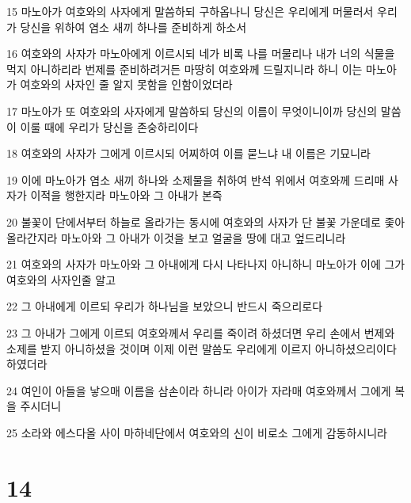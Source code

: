 \par 15 마노아가 여호와의 사자에게 말씀하되 구하옵나니 당신은 우리에게 머물러서 우리가 당신을 위하여 염소 새끼 하나를 준비하게 하소서
\par 16 여호와의 사자가 마노아에게 이르시되 네가 비록 나를 머물리나 내가 너의 식물을 먹지 아니하리라 번제를 준비하려거든 마땅히 여호와께 드릴지니라 하니 이는 마노아가 여호와의 사자인 줄 알지 못함을 인함이었더라
\par 17 마노아가 또 여호와의 사자에게 말씀하되 당신의 이름이 무엇이니이까 당신의 말씀이 이룰 때에 우리가 당신을 존숭하리이다
\par 18 여호와의 사자가 그에게 이르시되 어찌하여 이를 묻느냐 내 이름은 기묘니라
\par 19 이에 마노아가 염소 새끼 하나와 소제물을 취하여 반석 위에서 여호와께 드리매 사자가 이적을 행한지라 마노아와 그 아내가 본즉
\par 20 불꽃이 단에서부터 하늘로 올라가는 동시에 여호와의 사자가 단 불꽃 가운데로 좇아 올라간지라 마노아와 그 아내가 이것을 보고 얼굴을 땅에 대고 엎드리니라
\par 21 여호와의 사자가 마노아와 그 아내에게 다시 나타나지 아니하니 마노아가 이에 그가 여호와의 사자인줄 알고
\par 22 그 아내에게 이르되 우리가 하나님을 보았으니 반드시 죽으리로다
\par 23 그 아내가 그에게 이르되 여호와께서 우리를 죽이려 하셨더면 우리 손에서 번제와 소제를 받지 아니하셨을 것이며 이제 이런 말씀도 우리에게 이르지 아니하셨으리이다 하였더라
\par 24 여인이 아들을 낳으매 이름을 삼손이라 하니라 아이가 자라매 여호와께서 그에게 복을 주시더니
\par 25 소라와 에스다올 사이 마하네단에서 여호와의 신이 비로소 그에게 감동하시니라

\chapter{14}

